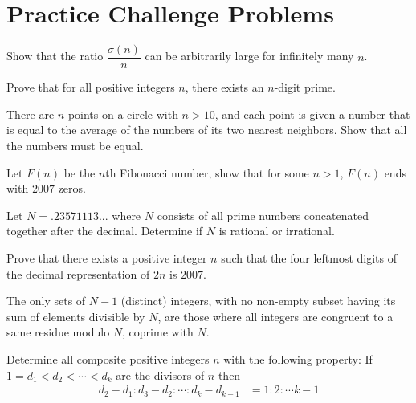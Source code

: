 \documentclass[problems.tex]{subfile}
\begin{document}
\chapter{Practice Challenge Problems}\label{ch:unsolved}
	
	\begin{problem}
		Show that the ratio $\dfrac{\sigma(n)}{n}$ can be arbitrarily large for infinitely many $n$\watermark.
	\end{problem}

	\begin{problem}
		Prove that for all positive integers $n$, there exists an $n$-digit prime.
	\end{problem}
	
	\begin{problem}
		There are $n$ points on a circle with $n>10$, and each point is given a number that is equal to the average of the numbers of its two nearest neighbors. Show that all the numbers must be equal.
	\end{problem}
	
	\begin{problem}
		Let $F(n)$ be the $n$th Fibonacci number, show that for some $n>1$, $F(n)$ ends with $2007$ zeros.
	\end{problem}
	
	\begin{problem}
		Let $N=.23571113...$ where $N$ consists of all prime numbers concatenated together after the decimal. Determine if $N$ is rational or irrational.
	\end{problem}
	
	\begin{problem}
		Prove that there exists a positive integer $n$ such that the four leftmost digits of the decimal representation of $2n$ is $2007$.
	\end{problem}
	
	\begin{problem}
		The only sets of $N-1$ (distinct) integers, with no non-empty subset having its sum of elements divisible by $N$, are those where all integers are congruent to a same residue modulo $N$, coprime with $N$.
	\end{problem}
	
	\begin{problem}
		Determine all composite positive integers $n$ with the following property: If $1=d_1<d_2<\cdots<d_k$ are the divisors of $n$ then
			\begin{align*}
				d_2-d_1:d_3-d_2:\cdots:d_k-d_{k-1} & = 1:2:\cdots k-1
			\end{align*}
	\end{problem}
	
\end{document}
